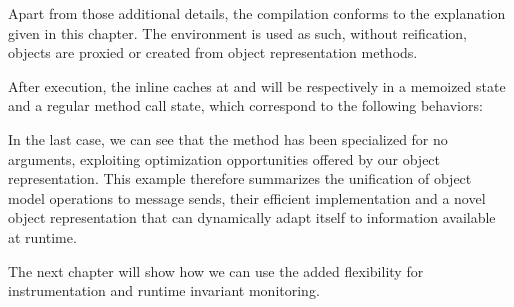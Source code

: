 Apart from those additional details, the compilation conforms to the
explanation given in this chapter. The environment is used as such, without
reification, objects are proxied or created from object representation methods.

After execution, the inline caches at  and  will
be respectively in a memoized state and a regular method call state, which
correspond to the following behaviors: 


In the last case, we can see that the  method has been specialized for
no arguments, exploiting optimization opportunities offered by our object
representation. This example therefore summarizes the unification of object
model operations to message sends, their efficient implementation and a novel
object representation that can dynamically adapt itself to information
available at runtime.

The next chapter will show how we can use the added flexibility for
instrumentation and runtime invariant monitoring.


